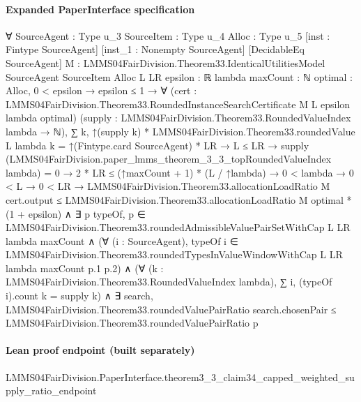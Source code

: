 \documentclass[10pt]{article}
\begin{document}
\paragraph{Expanded PaperInterface specification}
\begin{ReviewVerbatim}
∀ {SourceAgent : Type u_3} {SourceItem : Type u_4} {Alloc : Type u_5} [inst : Fintype SourceAgent]
  [inst_1 : Nonempty SourceAgent] [DecidableEq SourceAgent]
  {M : LMMS04FairDivision.Theorem33.IdenticalUtilitiesModel SourceAgent SourceItem Alloc} {L LR epsilon : ℝ}
  {lambda maxCount : ℕ} {optimal : Alloc},
  0 < epsilon →
    epsilon ≤ 1 →
      ∀ (cert : LMMS04FairDivision.Theorem33.RoundedInstanceSearchCertificate M L epsilon lambda optimal)
        (supply : LMMS04FairDivision.Theorem33.RoundedValueIndex lambda → ℕ),
        ∑ k, ↑(supply k) * LMMS04FairDivision.Theorem33.roundedValue L lambda k = ↑(Fintype.card SourceAgent) * LR →
          L ≤ LR →
            supply (LMMS04FairDivision.paper_lmms_theorem_3_3_topRoundedValueIndex lambda) = 0 →
              2 * LR ≤ (↑maxCount + 1) * (L / ↑lambda) →
                0 < lambda →
                  0 < L →
                    0 < LR →
                      LMMS04FairDivision.Theorem33.allocationLoadRatio M cert.output ≤
                          LMMS04FairDivision.Theorem33.allocationLoadRatio M optimal * (1 + epsilon) ∧
                        ∃ p typeOf,
                          p ∈ LMMS04FairDivision.Theorem33.roundedAdmissibleValuePairSetWithCap L LR lambda maxCount ∧
                            (∀ (i : SourceAgent),
                                typeOf i ∈
                                  LMMS04FairDivision.Theorem33.roundedTypesInValueWindowWithCap L LR lambda maxCount p.1
                                    p.2) ∧
                              (∀ (k : LMMS04FairDivision.Theorem33.RoundedValueIndex lambda),
                                  ∑ i, (typeOf i).count k = supply k) ∧
                                ∃ search,
                                  LMMS04FairDivision.Theorem33.roundedValuePairRatio search.chosenPair ≤
                                    LMMS04FairDivision.Theorem33.roundedValuePairRatio p
\end{ReviewVerbatim}

\paragraph{Lean proof endpoint (built separately)}\begin{ReviewVerbatim}
LMMS04FairDivision.PaperInterface.theorem3_3_claim34_capped_weighted_supply_ratio_endpoint
\end{ReviewVerbatim}
\end{document}
